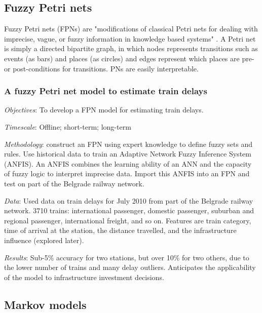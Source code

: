 \documentclass{article}
\begin{document}
\subsection{Fuzzy Petri nets}

Fuzzy Petri nets (FPNs) are "modifications of classical Petri nets for dealing with imprecise, vague, or fuzzy information in knowledge based systems" \cite{liu_et_al_2017}. A Petri net is simply a directed bipartite graph, in which nodes represents transitions such as events (as bars) and places (as circles) and edges represent which places are pre- or post-conditions for transitions. PNs are easily interpretable. 

\subsubsection{A fuzzy Petri net model to estimate train delays \cite{milinkovic_et_al_2013}}

\textit{Objectives}: To develop a FPN model for estimating train delays.

\smallskip

\textit{Timescale}: Offline; short-term; long-term

\smallskip

\textit{Methodology}: construct an FPN using expert knowledge to define fuzzy sets and rules. Use historical data to train an Adaptive Network Fuzzy Inference System (ANFIS). An ANFIS combines the learning ability of an ANN and the capacity of fuzzy logic to interpret imprecise data. Import this ANFIS into an FPN and test on part of the Belgrade railway network. 

\smallskip

\textit{Data}: Used data on train delays for July 2010 from part of the Belgrade railway network.  3710 trains: international passenger, domestic passenger, suburban and regional passenger, international freight, and so on. Features are train category, time of arrival at the station, the distance travelled, and the infrastructure influence (explored later). 

\smallskip

\textit{Results}: Sub-5\% accuracy for two stations, but over 10\% for two others, due to the lower number of trains and many delay outliers. Anticipates the applicability of the model to infrastructure investment decisions.

\subsection{Markov models}
\end{document}
